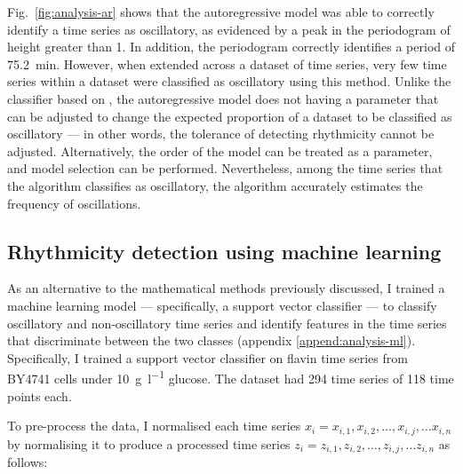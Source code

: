 Fig.\ \ref{fig:analysis-ar} shows that the autoregressive model was able to correctly identify a time series as oscillatory, as evidenced by a peak in the periodogram of height greater than 1.
In addition, the periodogram correctly identifies a period of \SI{75.2}{\minute}.
However, when extended across a dataset of time series, very few time series within a dataset were classified as oscillatory using this method.
Unlike the classifier based on \textcite{glynnDetectingPeriodicPatterns2006a}, the autoregressive model does not having a parameter that can be adjusted to change the expected proportion of a dataset to be classified as oscillatory --- in other words, the tolerance of detecting rhythmicity cannot be adjusted.
Alternatively, the order of the model can be treated as a parameter, and model selection can be performed.
Nevertheless, among the time series that the algorithm classifies as oscillatory, the algorithm accurately estimates the frequency of oscillations.


\subsection{Rhythmicity detection using machine learning}
\label{subsec:analysis-classification-ml}



As an alternative to the mathematical methods previously discussed, I trained a machine learning model --- specifically, a support vector classifier --- to classify oscillatory and non-oscillatory time series and identify features in the time series that discriminate between the two classes (appendix \ref{append:analysis-ml}).
%
Specifically, I trained a support vector classifier on flavin time series from BY4741 cells  under \SI{10}{\gram~\litre^{-1}} glucose.
The dataset had 294 time series of 118 time points each.


To pre-process the data, I normalised each time series $x_{i} = x_{i,1}, x_{i,2}, \ldots , x_{i,j}, \ldots x_{i,n}$ by normalising it to produce a processed time series $z_{i} = z_{i,1}, z_{i,2}, \ldots , z_{i,j}, \ldots z_{i,n}$ as follows:

